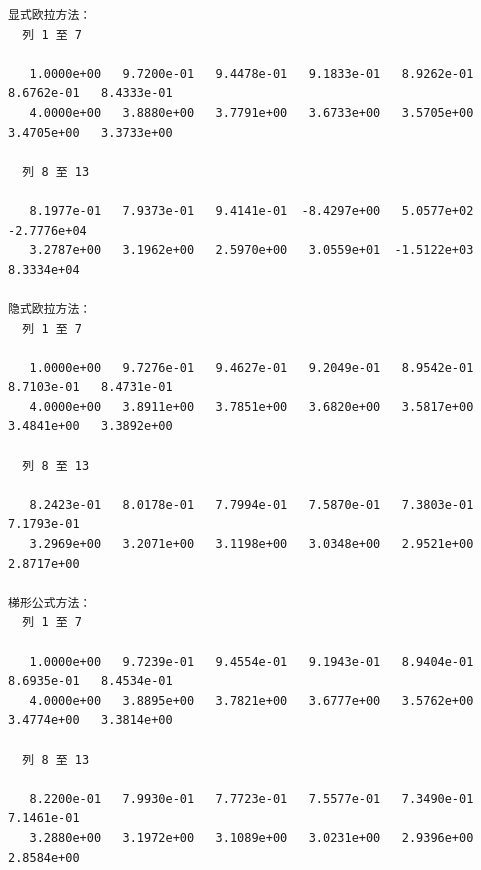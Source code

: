 \documentclass[12pt,a4paper]{article}
\begin{document}
\begin{verbatim}
显式欧拉方法：
  列 1 至 7

   1.0000e+00   9.7200e-01   9.4478e-01   9.1833e-01   8.9262e-01   8.6762e-01   8.4333e-01
   4.0000e+00   3.8880e+00   3.7791e+00   3.6733e+00   3.5705e+00   3.4705e+00   3.3733e+00

  列 8 至 13

   8.1977e-01   7.9373e-01   9.4141e-01  -8.4297e+00   5.0577e+02  -2.7776e+04
   3.2787e+00   3.1962e+00   2.5970e+00   3.0559e+01  -1.5122e+03   8.3334e+04

隐式欧拉方法：
  列 1 至 7

   1.0000e+00   9.7276e-01   9.4627e-01   9.2049e-01   8.9542e-01   8.7103e-01   8.4731e-01
   4.0000e+00   3.8911e+00   3.7851e+00   3.6820e+00   3.5817e+00   3.4841e+00   3.3892e+00

  列 8 至 13

   8.2423e-01   8.0178e-01   7.7994e-01   7.5870e-01   7.3803e-01   7.1793e-01
   3.2969e+00   3.2071e+00   3.1198e+00   3.0348e+00   2.9521e+00   2.8717e+00

梯形公式方法：
  列 1 至 7

   1.0000e+00   9.7239e-01   9.4554e-01   9.1943e-01   8.9404e-01   8.6935e-01   8.4534e-01
   4.0000e+00   3.8895e+00   3.7821e+00   3.6777e+00   3.5762e+00   3.4774e+00   3.3814e+00

  列 8 至 13

   8.2200e-01   7.9930e-01   7.7723e-01   7.5577e-01   7.3490e-01   7.1461e-01
   3.2880e+00   3.1972e+00   3.1089e+00   3.0231e+00   2.9396e+00   2.8584e+00
\end{verbatim}
\end{document}
